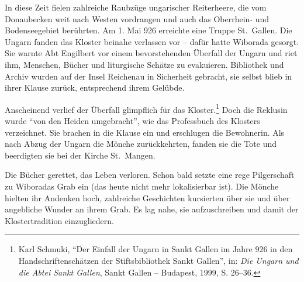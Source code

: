 \documentclass[a4paper,
fontsize=11pt,
oneside,
numbers=noperiodatend,
parskip=half-,
bibliography=totoc,
final
]{scrartcl}
\begin{document}
In diese Zeit fielen zahlreiche Raubzüge ungarischer Reiterheere, die
vom Donaubecken weit nach Westen vordrangen und auch das Oberrhein- und
Bodenseegebiet berührten. Am 1. Mai 926 erreichte eine Truppe
St.~Gallen. Die Ungarn fanden das Kloster beinahe verlassen vor -- dafür
hatte Wiborada gesorgt. Sie warnte Abt Engilbert vor einem
bevorstehenden Überfall der Ungarn und riet ihm, Menschen, Bücher und
liturgische Schätze zu evakuieren. Bibliothek und Archiv wurden auf der
Insel Reichenau in Sicherheit gebracht, sie selbst blieb in ihrer Klause
zurück, entsprechend ihrem Gelübde.

Anscheinend verlief der Überfall glimpflich für das Kloster.\footnote{Karl
  Schmuki, \enquote{Der Einfall der Ungarn in Sankt Gallen im Jahre 926
  in den Handschriftenschätzen der Stiftsbibliothek Sankt Gallen}, in:
  \emph{Die Ungarn und die Abtei Sankt Gallen}, Sankt Gallen --
  Budapest, 1999, S. 26--36.} Doch die Reklusin wurde \enquote{von den
Heiden umgebracht}, wie das Professbuch des Klosters verzeichnet. Sie
brachen in die Klause ein und erschlugen die Bewohnerin. Als nach Abzug
der Ungarn die Mönche zurückkehrten, fanden sie die Tote und beerdigten
sie bei der Kirche St.~Mangen.

Die Bücher gerettet, das Leben verloren. Schon bald setzte eine rege
Pilgerschaft zu Wiboradas Grab ein (das heute nicht mehr lokalisierbar
ist). Die Mönche hielten ihr Andenken hoch, zahlreiche Geschichten
kursierten über sie und über angebliche Wunder an ihrem Grab. Es lag
nahe, sie aufzuschreiben und damit der Klostertradition einzugliedern.
\end{document}
